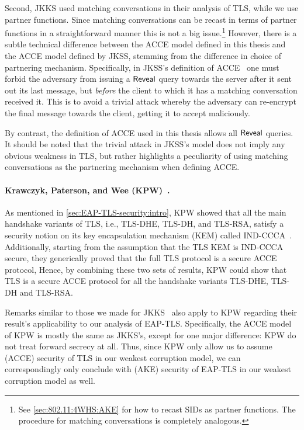 Second,
JKKS used matching conversations in their analysis of TLS,
while we use partner functions.
Since matching conversations can be recast in terms of partner functions in a straightforward manner this is not a big issue.\footnote{See
\cref{sec:802.11:4WHS:AKE} for how to recast SIDs as partner functions.
The procedure for matching conversations is completely analogous.
} 
However,
there is a subtle technical difference between the ACCE model defined in this thesis and the ACCE model defined by JKSS,
stemming from the difference in choice of partnering mechanism.	
Specifically,
in JKSS's definition
of ACCE~\cite[Def.~11]{C:JKSS12} one must forbid the adversary from issuing a $\mathsf{Reveal}$ query towards the server after it sent out its last message,
but \emph{before}  the client to which it has a matching conversation received it.
This is to avoid a trivial attack whereby the adversary can re-encrypt the final message towards the client,
getting it to accept maliciously.

By contrast,
the definition of ACCE used in this thesis allows all $\mathsf{Reveal}$ queries.
It should be noted that the trivial attack in JKSS's model does not imply any obvious weakness in TLS,
but rather highlights a peculiarity of using matching conversations as the partnering mechanism when defining ACCE. 

\paragraph{Krawczyk, Paterson, and Wee (KPW)~\texorpdfstring{\cite{C:KraPatWee13}}{}.}

As mentioned in \cref{sec:EAP-TLS-security:intro},
KPW showed that all the main handshake variants of TLS,
i.e.,
TLS-DHE, TLS-DH, and TLS-RSA, satisfy a security notion on its key encapsulation mechanism (KEM) called IND-CCCA~\cite{C:HofKil07}. 
Additionally, 
starting from the assumption that the TLS KEM is IND-CCCA secure,
they generically proved that the full TLS protocol is a secure ACCE protocol,
Hence,
by combining these two sets of results,
KPW could show that TLS is a secure ACCE protocol for all the handshake variants TLS-DHE, TLS-DH and TLS-RSA.


Remarks similar to those we made for JKKS~\cite{C:JKSS12} also apply to KPW 
regarding their result's applicability to our analysis of EAP-TLS.
Specifically,
the ACCE model of KPW is mostly the same as JKKS's,
except for one major difference:  KPW do not treat forward secrecy at all.
Thus,
since KPW only allow us to assume (ACCE) security of TLS in our weakest corruption model,
we can correspondingly only conclude with (AKE) security of EAP-TLS in our weakest corruption model \akenfstext as well. 

